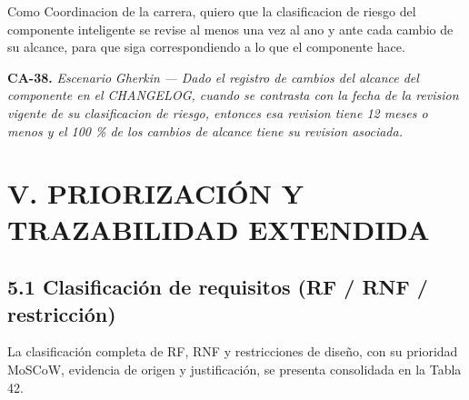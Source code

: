 
Como Coordinacion de la carrera, quiero que la clasificacion de riesgo del componente inteligente se revise al menos una vez al ano y ante cada cambio de su alcance, para que siga correspondiendo a lo que el componente hace.


\textbf{CA-38.} \textit{Escenario }\textit{Gherkin}\textit{ --- Dado el registro de cambios del alcance del componente en el CHANGELOG, cuando se contrasta con la fecha de la revision vigente de su clasificacion de riesgo, entonces esa revision tiene 12 meses o menos y el 100 \% de los cambios de alcance tiene su revision asociada.}


\section*{V. PRIORIZACIÓN Y TRAZABILIDAD EXTENDIDA}


\subsection*{5.1 Clasificación de requisitos (RF / RNF / restricción)}


La clasificación completa de RF, RNF y restricciones de diseño, con su prioridad MoSCoW, evidencia de origen y justificación, se presenta consolidada en la Tabla 42.


